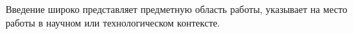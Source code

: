 
Введение широко представляет предметную область работы, указывает на место работы в научном или технологическом контексте.